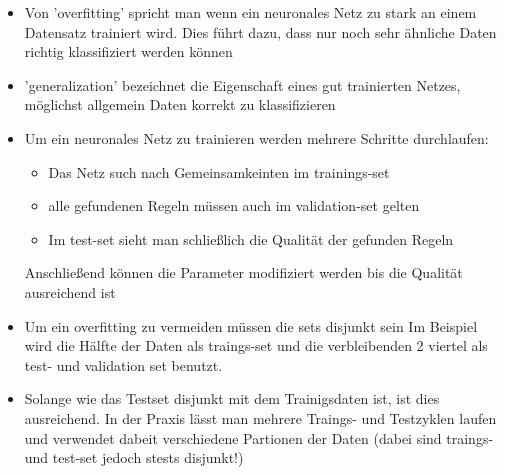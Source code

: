 \begin{itemize}
	\item 	Von 'overfitting' spricht man wenn ein neuronales Netz zu stark an einem Datensatz trainiert wird.
		Dies führt dazu, dass nur noch sehr ähnliche Daten richtig klassifiziert werden können

	\item 	'generalization' bezeichnet die Eigenschaft eines gut trainierten Netzes, möglichst allgemein Daten korrekt zu klassifizieren

	\item 	Um ein neuronales Netz zu trainieren werden mehrere Schritte durchlaufen:
		\begin{itemize}
			\item Das Netz such nach Gemeinsamkeinten im trainings-set
			\item alle gefundenen Regeln müssen auch im validation-set gelten
			\item Im test-set sieht man schließlich die Qualität der gefunden Regeln
		\end{itemize}
		Anschließend können die Parameter modifiziert werden bis die Qualität ausreichend ist

	\item 	Um ein overfitting zu vermeiden müssen die sets disjunkt sein
		Im Beispiel wird die Hälfte der Daten als traings-set und die verbleibenden 2 viertel als test- und validation set benutzt.

	\item 	Solange wie das Testset disjunkt mit dem Trainigsdaten ist, ist dies ausreichend.
	 	In der Praxis lässt man mehrere Traings- und Testzyklen laufen und verwendet dabeit verschiedene Partionen der Daten (dabei sind traings- und test-set jedoch stests disjunkt!)

\end{itemize}
